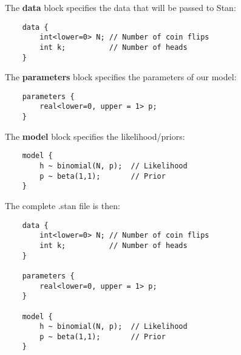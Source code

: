 \documentclass{beamer}
\begin{document}
\begin{frame}[fragile]
The \textbf{data} block specifies the data that will be passed to Stan:
\begin{verbatim}
    data {
        int<lower=0> N; // Number of coin flips
        int k;          // Number of heads
    }
\end{verbatim}
\end{frame}

\begin{frame}[fragile]
The \textbf{parameters} block specifies the parameters of our model:
\begin{verbatim}
    parameters {
        real<lower=0, upper = 1> p;
    }
\end{verbatim}
\end{frame}

\begin{frame}[fragile]
The \textbf{model} block specifies the likelihood/priors:
\begin{verbatim}
    model {
        h ~ binomial(N, p);  // Likelihood
        p ~ beta(1,1);       // Prior
    }
\end{verbatim}
\end{frame}

\begin{frame}[fragile]
The complete .stan file is then:
\begin{verbatim}
    data {
        int<lower=0> N; // Number of coin flips
        int k;          // Number of heads
    }
    
    parameters {
        real<lower=0, upper = 1> p;
    }
    
    model {
        h ~ binomial(N, p);  // Likelihood
        p ~ beta(1,1);       // Prior
    }
\end{verbatim}
\end{frame}
\end{document}
